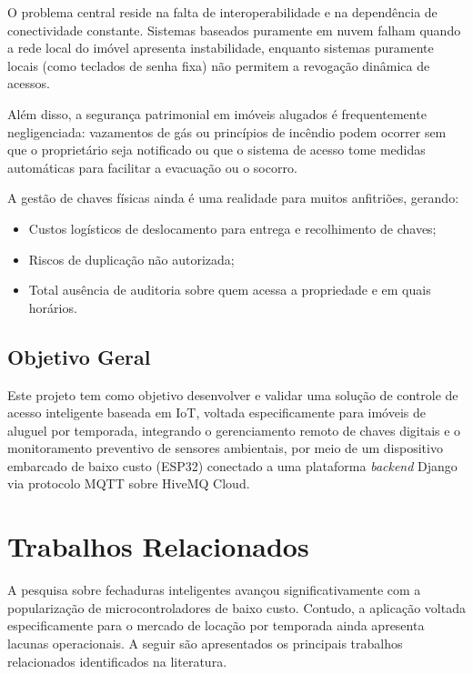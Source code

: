 \documentclass[12pt,a4paper]{article}
\begin{document}
O problema central reside na falta de interoperabilidade e na dependência de
conectividade constante. Sistemas baseados puramente em nuvem falham quando a rede
local do imóvel apresenta instabilidade, enquanto sistemas puramente locais (como
teclados de senha fixa) não permitem a revogação dinâmica de acessos.

Além disso, a segurança patrimonial em imóveis alugados é frequentemente negligenciada:
vazamentos de gás ou princípios de incêndio podem ocorrer sem que o proprietário seja
notificado ou que o sistema de acesso tome medidas automáticas para facilitar a
evacuação ou o socorro.

A gestão de chaves físicas ainda é uma realidade para muitos anfitriões, gerando:
\begin{itemize}
  \item Custos logísticos de deslocamento para entrega e recolhimento de chaves;
  \item Riscos de duplicação não autorizada;
  \item Total ausência de auditoria sobre quem acessa a propriedade e em quais horários.
\end{itemize}

\subsection{Objetivo Geral}

Este projeto tem como objetivo desenvolver e validar uma solução de controle de acesso
inteligente baseada em IoT, voltada especificamente para imóveis de aluguel por
temporada, integrando o gerenciamento remoto de chaves digitais e o monitoramento
preventivo de sensores ambientais, por meio de um dispositivo embarcado de baixo custo
(ESP32) conectado a uma plataforma \emph{backend} Django via protocolo MQTT sobre
HiveMQ Cloud.

\section{Trabalhos Relacionados}

A pesquisa sobre fechaduras inteligentes avançou significativamente com a
popularização de microcontroladores de baixo custo. Contudo, a aplicação voltada
especificamente para o mercado de locação por temporada ainda apresenta lacunas
operacionais. A seguir são apresentados os principais trabalhos relacionados
identificados na literatura.
\end{document}
